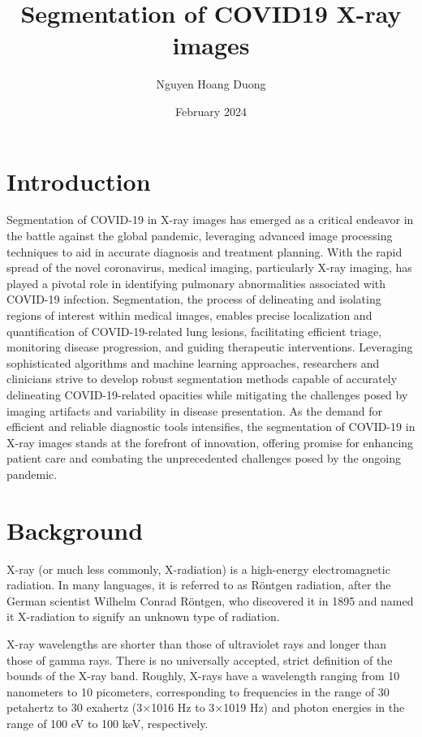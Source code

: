 \documentclass[twocolumn]{article}
\title{Segmentation of COVID19 X-ray images}
\author{Nguyen Hoang Duong}
\date{February 2024}
\begin{document}
\maketitle

\section{Introduction}
Segmentation of COVID-19 in X-ray images has emerged as a critical endeavor in the battle against the global pandemic, leveraging advanced image processing techniques to aid in accurate diagnosis and treatment planning. With the rapid spread of the novel coronavirus, medical imaging, particularly X-ray imaging, has played a pivotal role in identifying pulmonary abnormalities associated with COVID-19 infection. Segmentation, the process of delineating and isolating regions of interest within medical images, enables precise localization and quantification of COVID-19-related lung lesions, facilitating efficient triage, monitoring disease progression, and guiding therapeutic interventions. Leveraging sophisticated algorithms and machine learning approaches, researchers and clinicians strive to develop robust segmentation methods capable of accurately delineating COVID-19-related opacities while mitigating the challenges posed by imaging artifacts and variability in disease presentation. As the demand for efficient and reliable diagnostic tools intensifies, the segmentation of COVID-19 in X-ray images stands at the forefront of innovation, offering promise for enhancing patient care and combating the unprecedented challenges posed by the ongoing pandemic.

\section{Background}
X-ray (or much less commonly, X-radiation) is a high-energy electromagnetic radiation. In many languages, it is referred to as Röntgen radiation, after the German scientist Wilhelm Conrad Röntgen, who discovered it in 1895 and named it X-radiation to signify an unknown type of radiation.

X-ray wavelengths are shorter than those of ultraviolet rays and longer than those of gamma rays. There is no universally accepted, strict definition of the bounds of the X-ray band. Roughly, X-rays have a wavelength ranging from 10 nanometers to 10 picometers, corresponding to frequencies in the range of 30 petahertz to 30 exahertz (3×1016 Hz to 3×1019 Hz) and photon energies in the range of 100 eV to 100 keV, respectively.
\end{document}
